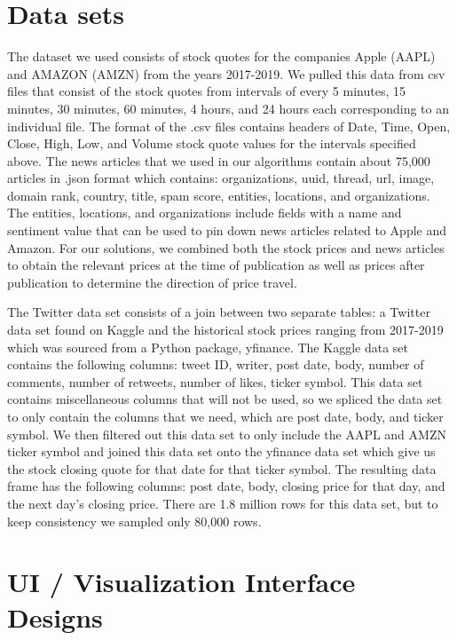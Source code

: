 \documentclass[conference]{IEEEtran}
\begin{document}
\section{Data sets}
The dataset we used consists of stock quotes for the companies Apple (AAPL) and AMAZON (AMZN) from the years 2017-2019. We pulled this data from csv files that consist of the stock quotes from intervals of every 5 minutes, 15 minutes, 30 minutes, 60 minutes, 4 hours, and 24 hours each corresponding to an individual file. The format of the .csv files contains headers of Date, Time, Open, Close, High, Low, and Volume stock quote values for the intervals specified above. The news articles that we used in our algorithms contain about 75,000 articles in .json format which contains: organizations, uuid, thread, url, image, domain rank, country, title, spam score, entities, locations, and organizations. The entities, locations, and organizations include fields with a name and sentiment value that can be used to pin down news articles related to Apple and Amazon.
For our solutions, we combined both the stock prices and news articles to obtain the relevant prices at the time of publication as well as prices after publication to determine the direction of price travel.

The Twitter data set consists of a join between two separate tables: a Twitter data set found on Kaggle and the historical stock prices ranging from 2017-2019 which was sourced from a Python package, yfinance. The Kaggle data set contains the following columns: tweet ID, writer, post date, body, number of comments, number of retweets, number of likes, ticker symbol. This data set contains miscellaneous columns that will not be used, so we spliced the data set to only contain the columns that we need, which are post date, body, and ticker symbol. We then filtered out this data set to only include the AAPL and AMZN ticker symbol and joined this data set onto the yfinance data set which give us the stock closing quote for that date for that ticker symbol. The resulting data frame has the following columns: post date, body, closing price for that day, and the next day's closing price. There are 1.8 million rows for this data set, but to keep consistency we sampled only 80,000 rows.

\section{UI / Visualization Interface Designs}
\end{document}
